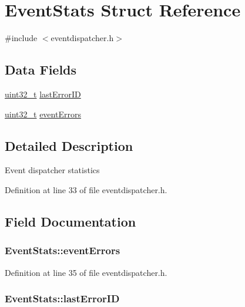 \hypertarget{struct_event_stats}{\section{Event\-Stats Struct Reference}
\label{struct_event_stats}
}


{\ttfamily \#include $<$eventdispatcher.\-h$>$}

\subsection*{Data Fields}
\begin{DoxyCompactItemize}
\item 
\hyperlink{stdint_8h_a435d1572bf3f880d55459d9805097f62}{uint32\-\_\-t} \hyperlink{struct_event_stats_a14d4a710533bb544b4fe350b842dfc9f}{last\-Error\-I\-D}
\item 
\hyperlink{stdint_8h_a435d1572bf3f880d55459d9805097f62}{uint32\-\_\-t} \hyperlink{struct_event_stats_a4734c9ef93875b98d9bb205537242be4}{event\-Errors}
\end{DoxyCompactItemize}


\subsection{Detailed Description}
Event dispatcher statistics 

Definition at line 33 of file eventdispatcher.\-h.



\subsection{Field Documentation}
\hypertarget{struct_event_stats_a4734c9ef93875b98d9bb205537242be4}{
\subsubsection[{event\-Errors}]{ Event\-Stats\-::event\-Errors}}\label{struct_event_stats_a4734c9ef93875b98d9bb205537242be4}


Definition at line 35 of file eventdispatcher.\-h.

\hypertarget{struct_event_stats_a14d4a710533bb544b4fe350b842dfc9f}{
\subsubsection[{last\-Error\-I\-D}]{ Event\-Stats\-::last\-Error\-I\-D}}\label{struct_event_stats_a14d4a710533bb544b4fe350b842dfc9f}


